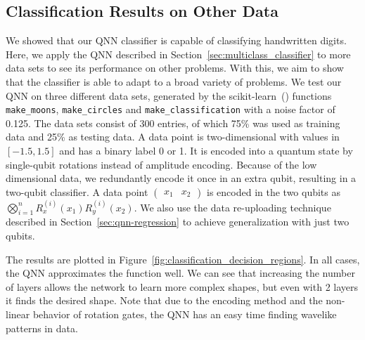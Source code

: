 \documentclass[a4paper,10pt]{article}
\begin{document}
\begin{appendices}
\section{Classification Results on Other Data} \label{sec:classification-other}
We showed that our QNN classifier is capable of classifying handwritten digits.
Here, we apply the QNN described in Section~\ref{sec:multiclass_classifier} to more data sets to see its performance on other problems.
With this, we aim to show that the classifier is able to adapt to a broad variety of problems.
We test our QNN on three different data sets, generated by the scikit-learn~(\cite{scikit-learn}) functions \verb|make_moons|, \verb|make_circles| and \verb|make_classification| with a noise factor of 0.125.
The data sets consist of 300 entries, of which 75\% was used as training data and 25\% as testing data.
A data point is two-dimensional with values in $[-1.5, 1.5]$ and has a binary label 0 or 1.
It is encoded into a quantum state by single-qubit rotations instead of amplitude encoding.
Because of the low dimensional data, we redundantly encode it once in an extra qubit, resulting in a two-qubit classifier.
A data point $(\begin{matrix}x_1 & x_2\end{matrix})$ is encoded in the two qubits as $\bigotimes_{i=1}^{n}R_x^{(i)}(x_1)R_y^{(i)}(x_2)$.
We also use the data re-uploading technique described in Section~\ref{sec:qnn-regression} to achieve generalization with just two qubits.

The results are plotted in Figure~\ref{fig:classification_decision_regions}.
In all cases, the QNN approximates the function well.
We can see that increasing the number of layers allows the network to learn more complex shapes, but even with 2 layers it finds the desired shape.
Note that due to the encoding method and the non-linear behavior of rotation gates, the QNN has an easy time finding wavelike patterns in data.


\end{appendices}
\end{document}
